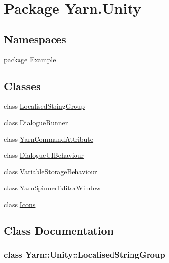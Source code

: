 \hypertarget{a00107}{\section{Package Yarn.\-Unity}
\label{a00107}
}
\subsection*{Namespaces}
\begin{DoxyCompactItemize}
\item 
package \hyperlink{a00309}{Example}
\end{DoxyCompactItemize}
\subsection*{Classes}
\begin{DoxyCompactItemize}
\item 
class \hyperlink{a00107_d3/db8/a00316}{Localised\-String\-Group}
\item 
class \hyperlink{a00071}{Dialogue\-Runner}
\item 
class \hyperlink{a00167}{Yarn\-Command\-Attribute}
\item 
class \hyperlink{a00073}{Dialogue\-U\-I\-Behaviour}
\item 
class \hyperlink{a00165}{Variable\-Storage\-Behaviour}
\item 
class \hyperlink{a00160}{Yarn\-Spinner\-Editor\-Window}
\item 
class \hyperlink{a00085}{Icons}
\end{DoxyCompactItemize}


\subsection{Class Documentation}
\label{d3/db8/a00316}
\hypertarget{a00107_d3/db8/a00316}{}
\subsubsection{class Yarn\-:\-:Unity\-:\-:Localised\-String\-Group}


